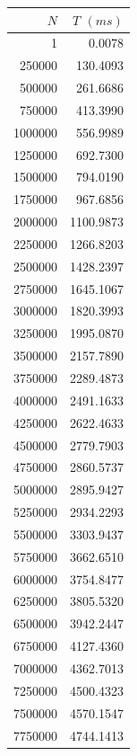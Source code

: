 \begin{table}
    \footnotesize
    \centering
    \begin{tabular}{|r|r|}
        \hline
        $N$ & $T$ $(ms)$ \\
        \hline
        1 & 0.0078 \\ 
        250000 & 130.4093 \\ 
        500000 & 261.6686 \\ 
        750000 & 413.3990 \\ 
        1000000 & 556.9989 \\ 
        1250000 & 692.7300 \\ 
        1500000 & 794.0190 \\ 
        1750000 & 967.6856 \\ 
        2000000 & 1100.9873 \\ 
        2250000 & 1266.8203 \\ 
        2500000 & 1428.2397 \\ 
        2750000 & 1645.1067 \\ 
        3000000 & 1820.3993 \\ 
        3250000 & 1995.0870 \\ 
        3500000 & 2157.7890 \\ 
        3750000 & 2289.4873 \\ 
        4000000 & 2491.1633 \\ 
        4250000 & 2622.4633 \\ 
        4500000 & 2779.7903 \\ 
        4750000 & 2860.5737 \\ 
        5000000 & 2895.9427 \\ 
        5250000 & 2934.2293 \\ 
        5500000 & 3303.9437 \\ 
        5750000 & 3662.6510 \\ 
        6000000 & 3754.8477 \\ 
        6250000 & 3805.5320 \\ 
        6500000 & 3942.2447 \\ 
        6750000 & 4127.4360 \\ 
        7000000 & 4362.7013 \\ 
        7250000 & 4500.4323 \\ 
        7500000 & 4570.1547 \\ 
        7750000 & 4744.1413 \\ 

\end{tabular}
\end{table}
